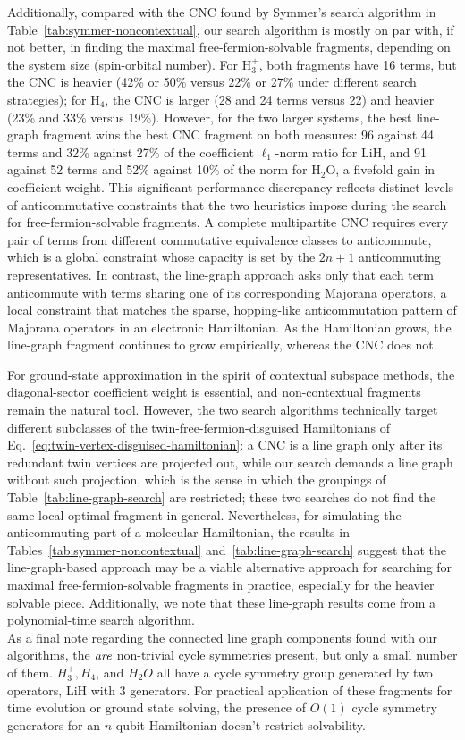 \documentclass[%
 aip,
 amsmath,amssymb,
 reprint,%
]{revtex4-1}
\begin{document}
Additionally, compared with the CNC found by Symmer's search algorithm in Table~\ref{tab:symmer-noncontextual}, our search algorithm is mostly on par with, if not better, in finding the maximal free-fermion-solvable fragments, depending on the system size (spin-orbital number). For H$_3^+$, both fragments have 16 terms, but the CNC is heavier (42\% or 50\% versus 22\% or 27\% under different search %
strategies); for H$_4$, the CNC is larger (28 and 24 terms versus 22) and heavier (23\% and 33\% versus 19\%). However, for the two larger systems, the best line-graph fragment wins the best CNC fragment on both measures: 96 against 44 terms and 32\% against 27\% of the coefficient $\ell_1$-norm ratio for LiH, and 91 against 52 terms and 52\% against 10\% of the norm for H$_2$O, a fivefold gain in coefficient weight. This significant performance discrepancy reflects distinct levels of anticommutative constraints that the two heuristics impose during the search for free-fermion-solvable fragments. A complete multipartite CNC requires every pair of terms from different commutative equivalence classes to anticommute, which is a global constraint whose capacity is set by the $2n+1$ anticommuting representatives.  In contrast, the line-graph approach asks only that each term anticommute with terms sharing one of its corresponding Majorana operators, a local constraint that matches the sparse, hopping-like anticommutation pattern of Majorana operators in an electronic Hamiltonian. As the Hamiltonian grows, the line-graph fragment continues to grow empirically, whereas the CNC does not.

For ground-state approximation in the spirit of contextual subspace methods, the diagonal-sector coefficient weight is essential, and non-contextual fragments remain the natural tool. However, the two search algorithms technically target different subclasses of the twin-free-fermion-disguised Hamiltonians of Eq.~\eqref{eq:twin-vertex-disguised-hamiltonian}: a CNC is a line graph only after its redundant twin vertices are projected out, while our search demands a line graph without such projection, which is the sense in which the groupings of Table~\ref{tab:line-graph-search} are restricted; these two searches do not find the same local optimal fragment in general. Nevertheless, for simulating the anticommuting part of a molecular Hamiltonian, the results in Tables~\ref{tab:symmer-noncontextual} and~\ref{tab:line-graph-search} suggest that the line-graph-based approach may be a viable alternative approach for searching for maximal free-fermion-solvable fragments in practice, especially for the heavier solvable piece. Additionally, we note that these line-graph results come from a polynomial-time search algorithm. \\
\indent As a final note regarding the connected line graph components found with our algorithms, the ${\it are}$ non-trivial cycle symmetries present, but only a small number of them. $H_3^+, H_4$, and $H_2O$ all have a cycle symmetry group generated by two operators, LiH with 3 generators. For practical application of these fragments for time evolution or ground state solving, the presence of $O(1)$ cycle symmetry generators for an $n$ qubit Hamiltonian doesn't restrict solvability. 
\end{document}
